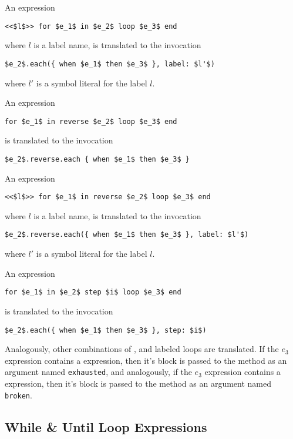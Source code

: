 An expression 
\begin{lstlisting}
<<$l$>> for $e_1$ in $e_2$ loop $e_3$ end
\end{lstlisting} 
where $l$ is a label name, is translated to the invocation
\begin{lstlisting}[deletekeywords={label}]
$e_2$.each({ when $e_1$ then $e_3$ }, label: $l'$)
\end{lstlisting}
where $l'$ is a symbol literal for the label $l$. 

An expression 
\begin{lstlisting}
for $e_1$ in reverse $e_2$ loop $e_3$ end
\end{lstlisting} 
is translated to the invocation
\begin{lstlisting}[deletekeywords={reverse}]
$e_2$.reverse.each { when $e_1$ then $e_3$ }
\end{lstlisting} 

An expression 
\begin{lstlisting}
<<$l$>> for $e_1$ in reverse $e_2$ loop $e_3$ end
\end{lstlisting} 
where $l$ is a label name, is translated to the invocation
\begin{lstlisting}[deletekeywords={label,reverse}]
$e_2$.reverse.each({ when $e_1$ then $e_3$ }, label: $l'$)
\end{lstlisting}
where $l'$ is a symbol literal for the label $l$. 

An expression 
\begin{lstlisting}
for $e_1$ in $e_2$ step $i$ loop $e_3$ end
\end{lstlisting} 
is translated to the invocation
\begin{lstlisting}[deletekeywords={step}]
$e_2$.each({ when $e_1$ then $e_3$ }, step: $i$)
\end{lstlisting} 

Analogously, other combinations of ,  and labeled loops are translated. If the $e_3$ expression contains a  expression, then it's block is passed to the  method as an argument named \lstinline[deletekeywords={exhausted}]{exhausted}, and analogously, if the $e_3$ expression contains a  expression, then it's block is passed to the  method as an argument named \lstinline[deletekeywords={broken}]{broken}.







\subsection{While \& Until Loop Expressions}

